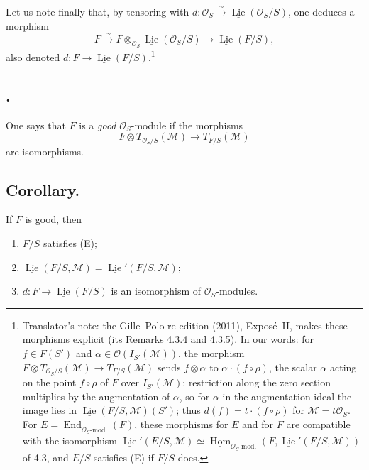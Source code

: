Let us note finally that, by tensoring with
\(d:\mathcal O_S\xrightarrow{\sim}\underline{\operatorname{Lie}}(\mathcal O_S/S)\),
one deduces a morphism
\[
 F\xrightarrow{\sim}F\otimes_{\mathcal O_S}
 \underline{\operatorname{Lie}}(\mathcal O_S/S)
 \longrightarrow\underline{\operatorname{Lie}}(F/S),
\]
also denoted \(d:F\to\underline{\operatorname{Lie}}(F/S)\).\footnote{Translator's
note: the Gille--Polo re-edition (2011), Expos\'e~II, makes these morphisms
explicit (its Remarks 4.3.4 and 4.3.5). In our words: for \(f\in F(S')\)
and \(\alpha\in\mathcal O(I_{S'}(\mathcal M))\), the morphism
\(F\otimes T_{\mathcal O_S/S}(\mathcal M)\to T_{F/S}(\mathcal M)\) sends
\(f\otimes\alpha\) to \(\alpha\cdot(f\circ\rho)\), the scalar \(\alpha\)
acting on the point \(f\circ\rho\) of \(F\) over \(I_{S'}(\mathcal M)\);
restriction along the zero section multiplies by the augmentation of
\(\alpha\), so for \(\alpha\) in the augmentation ideal the image lies in
\(\underline{\operatorname{Lie}}(F/S,\mathcal M)(S')\); thus
\(d(f)=t\cdot(f\circ\rho)\) for \(\mathcal M=t\mathcal O_S\). For
\(E=\underline{\operatorname{End}}_{\mathcal O_S\text{-mod.}}(F)\), these
morphisms for \(E\) and for \(F\) are compatible with the isomorphism
\(\underline{\operatorname{Lie}}'(E/S,\mathcal M)\simeq
\underline{\operatorname{Hom}}_{\mathcal O_S\text{-mod.}}(F,\underline{\operatorname{Lie}}'(F/S,\mathcal M))\)
of 4.3, and \(E/S\) satisfies (E) if \(F/S\) does.}

\subsection*{.}
One says that \(F\) is a \emph{good} \(\mathcal O_S\)-module if the
morphisms
\[
 F\otimes T_{\mathcal O_S/S}(\mathcal M)\longrightarrow T_{F/S}(\mathcal M)
\]
are isomorphisms.

\subsection*{Corollary.}
If \(F\) is good, then
\begin{enumerate}
  \item[(i)] \(F/S\) satisfies (E);
  \item[(ii)] \(\underline{\operatorname{Lie}}(F/S,\mathcal M)
    =\underline{\operatorname{Lie}}'(F/S,\mathcal M)\);
  \item[(iii)] \(d:F\to\underline{\operatorname{Lie}}(F/S)\) is an
    isomorphism of \(\mathcal O_S\)-modules.
\end{enumerate}

